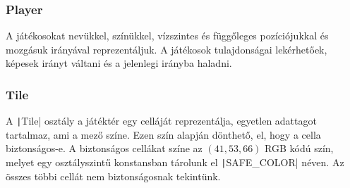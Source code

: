 \documentclass[a4paper,12pt]{article}
\begin{document}
	\subsubsection{Player}
	A játékosokat nevükkel, színükkel, vízszintes és függőleges pozíciójukkal és mozgásuk irányával reprezentáljuk. A játékosok tulajdonságai lekérhetőek, képesek irányt váltani és a jelenlegi irányba haladni.
	\subsubsection{Tile}
	A \texttt|Tile| osztály a játéktér egy celláját reprezentálja, egyetlen adattagot tartalmaz, ami a mező színe. Ezen szín alapján dönthető, el, hogy a cella biztonságos-e. A biztonságos cellákat színe az $ (41, 53, 66) $ RGB kódú szín, melyet egy osztályszintű konstansban tárolunk el \texttt|SAFE_COLOR| néven. Az összes többi cellát nem biztonságosnak tekintünk.
\end{document}
